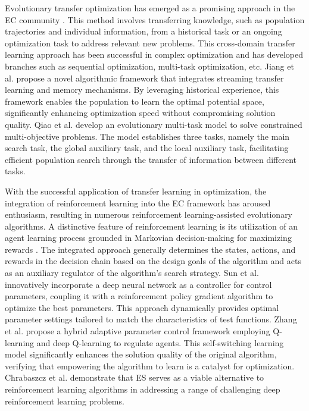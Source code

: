 \documentclass[journal,twoside]{IEEEtran}
\begin{document}
Evolutionary transfer optimization has emerged as a promising approach in the EC community \cite{9321762}. This method involves transferring knowledge, such as population trajectories and individual information, from a historical task or an ongoing optimization task to address relevant new problems. This cross-domain transfer learning approach has been successful in complex optimization and has developed branches such as sequential optimization, multi-task optimization, etc. Jiang et al. \cite{9097186} propose a novel algorithmic framework that integrates streaming transfer learning and memory mechanisms. By leveraging historical experience, this framework enables the population to learn the optimal potential space, significantly enhancing optimization speed without compromising solution quality. Qiao et al. \cite{qiao2023evolutionary} develop an evolutionary multi-task model to solve constrained multi-objective problems. The model establishes three tasks, namely the main search task, the global auxiliary task, and the local auxiliary task, facilitating efficient population search through the transfer of information between different tasks.

With the successful application of transfer learning in optimization, the integration of reinforcement learning into the EC framework has aroused enthusiasm, resulting in numerous reinforcement learning-assisted evolutionary algorithms. A distinctive feature of reinforcement learning is its utilization of an agent learning process grounded in Markovian decision-making for maximizing rewards \cite{10172347}. The integrated approach generally determines the states, actions, and rewards in the decision chain based on the design goals of the algorithm and acts as an auxiliary regulator of the algorithm's search strategy. Sun et al. \cite{sun2021learning} innovatively incorporate a deep neural network as a controller for control parameters, coupling it with a reinforcement policy gradient algorithm to optimize the best parameters. This approach dynamically provides optimal parameter settings tailored to match the characteristics of test functions. Zhang et al. \cite{10035716} propose a hybrid adaptive parameter control framework employing Q-learning and deep Q-learning to regulate agents. This self-switching learning model significantly enhances the solution quality of the original algorithm, verifying that empowering the algorithm to learn is a catalyst for optimization. Chrabaszcz et al. \cite{chrabaszcz2018back} demonstrate that ES serves as a viable alternative to reinforcement learning algorithms in addressing a range of challenging deep reinforcement learning problems.
\end{document}
